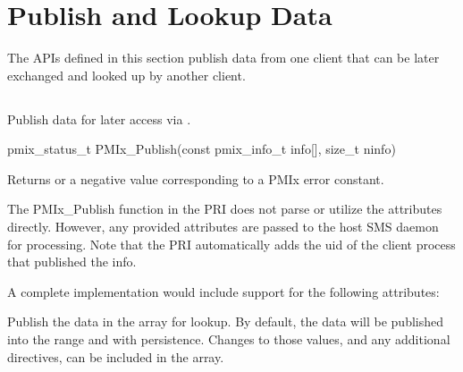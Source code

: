 \section{Publish and Lookup Data}
\label{chap:api_kv_mgmt:publish}

The APIs defined in this section publish data from one client that can be later exchanged and looked up by another client.

\subsection{}

\summary

Publish data for later access via .

\format

\cspecificstart
\begin{codepar}
pmix_status_t
PMIx_Publish(const pmix_info_t info[], size_t ninfo)
\end{codepar}
\cspecificend

\begin{arglist}
\end{arglist}

Returns  or a negative value corresponding to a PMIx error constant.

\priattr
The PMIx\_Publish function in the \ac{PRI} does not parse or utilize the attributes directly. However, any provided attributes are passed to the host \ac{SMS} daemon for processing. Note that the \ac{PRI} automatically adds the uid of the client process that published the info.

\optattr
A complete implementation would include support for the following attributes:


\descr

Publish the data in the  array for lookup.
By default, the data will be published into the  range and with  persistence.
Changes to those values, and any additional directives, can be included in the  array.

